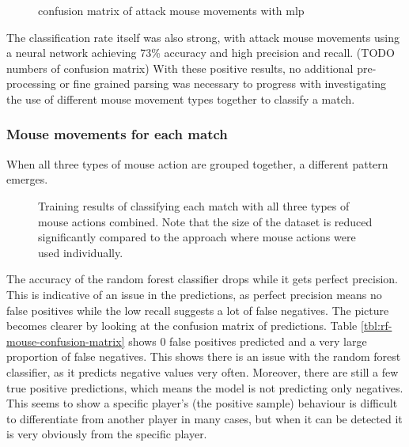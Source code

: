 \documentclass[Report.tex]{subfiles}
\newcommand{\newaxis}[7]{
\begin{axis}[
    ybar,
    title={#1},
    ymin=#3, ymax=#4,
    bar width=1em,
    width={#5},
    height={#6},
    legend style={at={#7},anchor=north,legend columns=-1},
    enlarge x limits=0.4,
    x tick label style={align=center,text width=2cm},
    symbolic x coords={Logistic Regression, Random Forest, Multi-layer Perceptron},
    xtick=data,
    ylabel={#2}
]
}
\newcommand{\plotbar}[3] {
\addplot+[
	discard if not={features}{#1},
] table [x=model, y=#2, col sep=comma] {data/15-game-cv.csv};
\addlegendentry{#3}
}
\begin{document}
\begin{figure}[H]
\caption{confusion matrix of attack mouse movements with mlp}
\end{figure}

The classification rate itself was also strong, with attack mouse movements using a neural network achieving 73\% accuracy and high precision and recall. (TODO numbers of confusion matrix) With these positive results, no additional pre-processing or fine grained parsing was necessary to progress with investigating the use of different mouse movement types together to classify a match.


\subsubsection{Mouse movements for each match}\label{sbsec:game-classification}
When all three types of mouse action are grouped together, a different pattern emerges. 

\begin{figure}[H]
\centering
{}
\caption{Training results of classifying each match with all three types of mouse actions combined. Note that the size of the dataset is reduced significantly compared to the approach where mouse actions were used individually.}
\end{figure}


The accuracy of the random forest classifier drops while it gets perfect precision. This is indicative of an issue in the predictions, as perfect precision means no false positives while the low recall suggests a lot of false negatives. The picture becomes clearer by looking at the confusion matrix of predictions. Table \ref{tbl:rf-mouse-confusion-matrix} shows 0 false positives predicted and a very large proportion of false negatives. This shows there is an issue with the random forest classifier, as it predicts negative values very often. Moreover, there are still a few true positive predictions, which means the model is not predicting only negatives. This seems to show a specific player's (the positive sample) behaviour is difficult to differentiate from another player in many cases, but when it can be detected it is very obviously from the specific player. 
\end{document}
